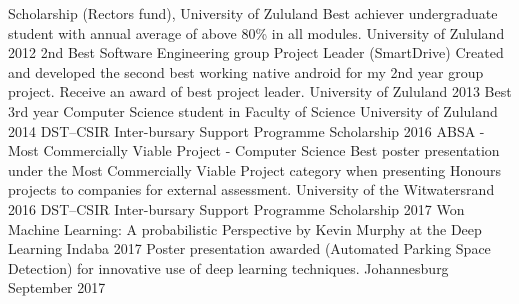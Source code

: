 \documentclass[]{awesome-cv}
\begin{document}
\begin{cvhonors}
	\cvhonor
	{Scholarship (Rector\textquotesingle{}s fund), University of Zululand}
	{Best achiever undergraduate student with annual average of above 80\% in all modules.}
	{University of Zululand}
	{2012}
	\cvhonor
	{2nd Best Software Engineering group Project Leader (SmartDrive)}
	{Created and developed the second best working native android for my 2nd year group project. Receive an award of best project leader.}
	{University of Zululand}
	{2013}
	\cvhonor
	{Best 3rd year Computer Science student in Faculty of Science}
	{}
	{University of Zululand}
	{2014}
	\cvhonor
	{DST–CSIR Inter-bursary Support Programme Scholarship}
	{}
	{}
	{2016}
	\cvhonor
	{ABSA - Most Commercially Viable Project - Computer Science}
	{Best poster presentation under the Most Commercially Viable Project category when presenting Honours projects to companies for external assessment.}
	{University of the Witwatersrand}
	{2016}
	\cvhonor
	{DST–CSIR Inter-bursary Support Programme Scholarship}
	{}
	{}
	{2017}
	\cvhonor
	{Won \textquotesingle{}Machine Learning: A probabilistic Perspective by Kevin Murphy\textquotesingle{} at the Deep Learning Indaba 2017}
	{Poster presentation awarded (Automated Parking Space Detection) for innovative use of deep learning techniques.}
	{Johannesburg}
	{September 2017}
\end{cvhonors}
\ 
\end{document}

